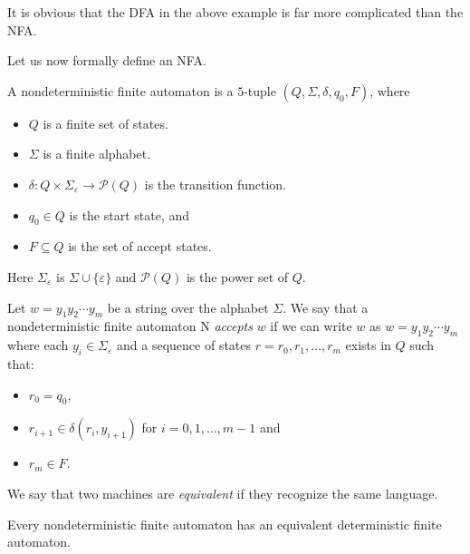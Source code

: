 It is obvious that the DFA in the above example is far more complicated than the NFA.

Let us now formally define an NFA.
\begin{definition}
A nondeterministic finite automaton is a $5$-tuple $(Q,\Sigma,\delta,q_0,F)$, where
\begin{itemize}
    \item $Q$ is a finite set of states.
    \item $\Sigma$ is a finite alphabet.
    \item $\delta:Q\times\Sigma_\varepsilon\to\mathcal{P}(Q)$ is the transition function.
    \item $q_0\in Q$ is the start state, and
    \item $F\subseteq Q$ is the set of accept states.
\end{itemize}
\end{definition}

Here $\Sigma_\varepsilon$ is $\Sigma\cup\{\varepsilon\}$ and $\mathcal{P}(Q)$ is the power set of $Q$.

\vspace{3mm}
Let $w=y_1y_2\cdots y_m$ be a string over the alphabet $\Sigma$. We say that a nondeterministic finite automaton N \textit{accepts} $w$ if we can write $w$ as $w=y_1y_2\cdots y_m$ where each $y_i\in\Sigma_\varepsilon$ and a sequence of states $r=r_0,r_1,\ldots,r_m$ exists in $Q$ such that:
\begin{itemize}
    \item $r_0=q_0$,
    \item $r_{i+1}\in\delta(r_i, y_{i+1})$ for $i=0,1,\ldots,m-1$ and
    \item $r_m\in F$.
\end{itemize}

\begin{definition}
We say that two machines are \textit{equivalent} if they recognize the same language.
\end{definition}
\begin{theorem}
Every nondeterministic finite automaton has an equivalent deterministic finite automaton.
\end{theorem}


